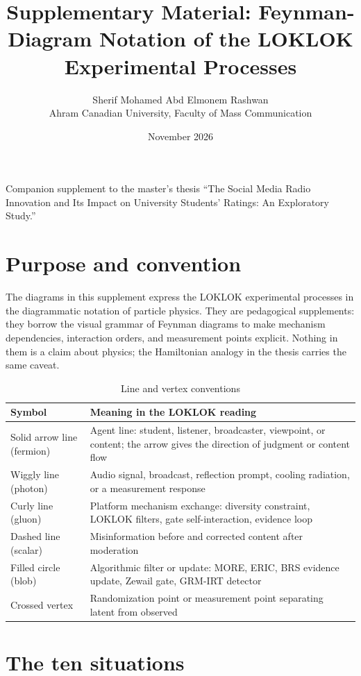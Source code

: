 \documentclass[11pt,a4paper]{article}
\title{Supplementary Material: Feynman-Diagram Notation of the LOKLOK Experimental Processes}
\author{Sherif Mohamed Abd Elmonem Rashwan \\ Ahram Canadian University, Faculty of Mass Communication}
\date{November 2026}
\begin{document}
\maketitle
\begin{center}\small Companion supplement to the master's thesis ``The Social Media Radio Innovation and Its Impact on University Students' Ratings: An Exploratory Study.''\end{center}

\section*{Purpose and convention}
The diagrams in this supplement express the LOKLOK experimental processes in the
diagrammatic notation of particle physics. They are pedagogical supplements: they
borrow the visual grammar of Feynman diagrams to make mechanism dependencies,
interaction orders, and measurement points explicit. Nothing in them is a claim
about physics; the Hamiltonian analogy in the thesis carries the same caveat.

\begin{table}[H]\centering\small
\caption{Line and vertex conventions}
\begin{tabular}{@{}ll@{}}
\toprule
Symbol & Meaning in the LOKLOK reading \\
\midrule
Solid arrow line (fermion) & Agent line: student, listener, broadcaster, viewpoint, or content; the arrow gives the direction of judgment or content flow \\
Wiggly line (photon) & Audio signal, broadcast, reflection prompt, cooling radiation, or a measurement response \\
Curly line (gluon) & Platform mechanism exchange: diversity constraint, LOKLOK filters, gate self-interaction, evidence loop \\
Dashed line (scalar) & Misinformation before and corrected content after moderation \\
Filled circle (blob) & Algorithmic filter or update: MORE, ERIC, BRS evidence update, Zewail gate, GRM-IRT detector \\
Crossed vertex & Randomization point or measurement point separating latent from observed \\
\bottomrule
\end{tabular}
\end{table}

\section*{The ten situations}
\end{document}
